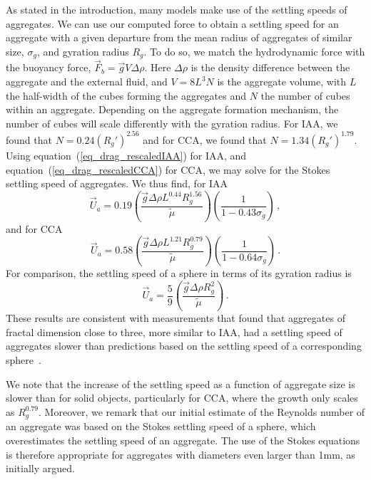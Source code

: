 As stated in the introduction, many models make use of the settling speeds of aggregates. We can use our computed force to obtain a settling speed for an aggregate with a given departure from the mean radius of aggregates of similar size, $\sigma_g$, and gyration radius $R_g$. To do so, we match the hydrodynamic force with the buoyancy force, $\vec{F}_b = \vec{g} V \Delta \rho$. Here $\Delta \rho$ is the density difference between the aggregate and the external fluid, and $V=8L^3N$ is the aggregate volume, with $L$ the half-width of the cubes forming the aggregates and $N$ the number of cubes within an aggregate. Depending on the aggregate formation mechanism, the number of cubes will scale differently with the gyration radius. For IAA, we found that $N=0.24(R_g')^{2.56}$ and for CCA, we found that $N=1.34 (R_g')^{1.79}$. Using equation~(\ref{eq_drag_rescaledIAA}) for IAA, and equation~(\ref{eq_drag_rescaledCCA}) for CCA, we may solve for the Stokes settling speed of aggregates. We thus find, for IAA
\begin{equation}
\vec{U}_a = 0.19  \left( \frac{\vec{g} \Delta \rho L^{0.44} R_g^{1.56}}{\tilde{\mu}} \right)  \left( \frac{1}{1-0.43\sigma_g}  \right)\,,
\end{equation}
and for CCA
\begin{equation}
\vec{U}_a = 0.58 \left( \frac{\vec{g} \Delta \rho L^{1.21} R_g^{0.79}}{\tilde{\mu}}  \right) \left( \frac{1}{1-0.64\sigma_g}  \right)\, .
\end{equation}
For comparison, the settling speed of a sphere in terms of its gyration radius is  
\begin{equation}
\vec{U}_a = \frac{5}{9} \left( \frac{\vec{g} \Delta \rho R_g^2}{\tilde{\mu}}  \right) \,.
\end{equation}
These results are consistent with measurements that found that aggregates of fractal dimension close to three, more similar to IAA, had a settling speed of aggregates slower than predictions based on the settling speed of a corresponding sphere~\cite{alldredge_situ_1988}.

We note that the increase of the settling speed as a function of aggregate size is slower than for solid objects, particularly for CCA, where the growth only scales as $R_g^{0.79}$. Moreover, we remark that our initial estimate of the Reynolds number of an aggregate was based on the Stokes settling speed of a sphere, which overestimates the settling speed of an aggregate. The use of the Stokes equations is therefore appropriate for aggregates with diameters even larger than 1mm, as initially argued.
 

